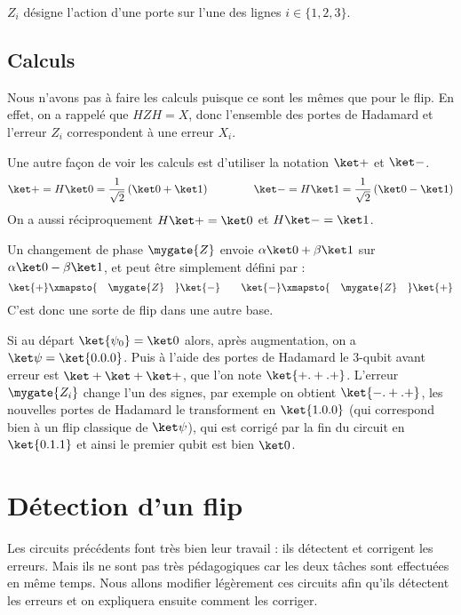 \documentclass[11pt,class=report,crop=false]{standalone}
\begin{document}
$Z_i$ désigne l'action d'une porte  sur l'une des lignes $i \in \{1,2,3\}$.

\subsection{Calculs}

Nous n'avons pas à faire les calculs puisque ce sont les mêmes que pour le flip.
En effet, on a rappelé que $HZH=X$, donc l'ensemble des portes de Hadamard et l'erreur $Z_i$ correspondent à une erreur $X_i$.

Une autre façon de voir les calculs est d'utiliser la notation $\ket+$ et $\ket-$.
$$\ket+ = H\ket0 = \frac{1}{\sqrt2}\left(\ket0+\ket1\right) \qquad\qquad 
\ket- = H\ket1 = \frac{1}{\sqrt2}\left(\ket0-\ket1\right)$$
On a aussi réciproquement $H\ket+ = \ket0$ et $H\ket-=\ket1$.

Un changement de phase $\mygate{Z}$ envoie $\alpha\ket0 + \beta\ket1$ sur $\alpha\ket0 - \beta\ket1$, et peut être simplement défini par :
$$
\ket{+} \xmapsto{\quad\mygate{Z}\quad} \ket{-} \qquad
\ket{-} \xmapsto{\quad\mygate{Z}\quad} \ket{+}$$
C'est donc une sorte de flip dans une autre base.

Si au départ $\ket{\psi_0}=\ket0$ alors, après augmentation, on a $\ket\psi=\ket{0.0.0}$.
Puis à l'aide des portes de Hadamard le $3$-qubit avant erreur est $\ket+\ket+\ket+$, 
que l'on note $\ket{+.+.+}$.
L'erreur $\mygate{Z_i}$ change l'un des signes, par exemple on obtient $\ket{-.+.+}$,
les nouvelles portes de Hadamard le transforment en $\ket{1.0.0}$ (qui correspond bien à un flip classique de $\ket\psi$), qui est corrigé par la fin du circuit en $\ket{0.1.1}$ et ainsi le premier qubit est bien $\ket0$.


\section{Détection d'un flip}

Les circuits précédents font très bien leur travail : ils détectent et corrigent les erreurs. Mais ils ne sont pas très pédagogiques car les deux tâches sont effectuées en même temps. Nous allons modifier légèrement ces circuits afin qu'ils détectent les erreurs et on expliquera ensuite comment les corriger.

\end{document}

